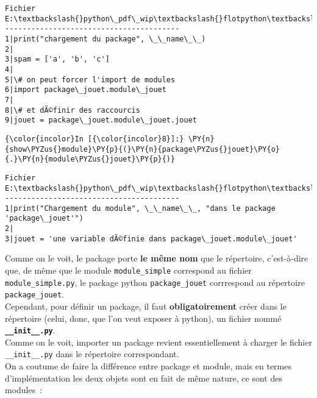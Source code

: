     \begin{Verbatim}[commandchars=\\\{\}]
Fichier E:\textbackslash{}python\_pdf\_wip\textbackslash{}flotpython\textbackslash{}w5\textbackslash{}package\_jouet\textbackslash{}\_\_init\_\_.py
----------------------------------------
1|print("chargement du package", \_\_name\_\_)
2|
3|spam = ['a', 'b', 'c']
4|
5|\# on peut forcer l'import de modules
6|import package\_jouet.module\_jouet
7|
8|\# et dÃ©finir des raccourcis
9|jouet = package\_jouet.module\_jouet.jouet

    \end{Verbatim}

    \begin{Verbatim}[commandchars=\\\{\}]
{\color{incolor}In [{\color{incolor}8}]:} \PY{n}{show\PYZus{}module}\PY{p}{(}\PY{n}{package\PYZus{}jouet}\PY{o}{.}\PY{n}{module\PYZus{}jouet}\PY{p}{)}
\end{Verbatim}


    \begin{Verbatim}[commandchars=\\\{\}]
Fichier E:\textbackslash{}python\_pdf\_wip\textbackslash{}flotpython\textbackslash{}w5\textbackslash{}package\_jouet\textbackslash{}module\_jouet.py
----------------------------------------
1|print("Chargement du module", \_\_name\_\_, "dans le package 'package\_jouet'")
2|
3|jouet = 'une variable dÃ©finie dans package\_jouet.module\_jouet'

    \end{Verbatim}

    Comme on le voit, le package porte \textbf{le même nom} que le
répertoire, c'est-à-dire que, de même que le module
\texttt{module\_simple} correspond au fichier
\texttt{module\_simple.py}, le package python \texttt{package\_jouet}
corrrespond au répertoire \texttt{package\_jouet}.\\

    Cependant, pour définir un package, il faut \textbf{obligatoirement}
créer dans le répertoire (celui, donc, que l'on veut exposer à python),
un fichier nommé \textbf{\texttt{\_\_init\_\_.py}}.\\

Comme on le voit, importer un package revient essentiellement à charger
le fichier \texttt{\_\_init\_\_.py} dans le répertoire correspondant.\\

    On a coutume de faire la différence entre package et module, mais en
termes d'implémentation les deux objets sont en fait de même nature, ce
sont des modules~:


